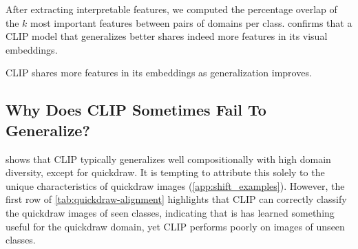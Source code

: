 After extracting interpretable features, we computed the percentage overlap of the $k$ most important features between pairs of domains per class.
 confirms that a CLIP model that generalizes better shares indeed more features in its visual embeddings.
\begin{finding}
    CLIP shares more features in its embeddings as generalization improves.
\end{finding}

\subsection{Why Does CLIP Sometimes Fail To Generalize?}\label{sec:quickdraw}
\begin{table}[t]
    \centering
    \caption{\textbf{Domain-specific captions do not explain CLIP's poor generalization performance to unseen quickdraw classes in the CG high-diversity setting.}
    As we replace all domain-specific captions (second row), we find that visual embeddings are more aligned (\cref{fig:quickdraw-alignment:aligned}) but this does not lead to improved generalization performance.
    }
    \label{tab:quickdraw-alignment}
\end{table}
 shows that CLIP typically generalizes well compositionally with high domain diversity, except for quickdraw. It is tempting to attribute this solely to the unique characteristics of quickdraw images (\cref{app:shift_examples}). However, the first row of \cref{tab:quickdraw-alignment} highlights that CLIP can correctly classify the quickdraw images of seen classes, indicating that is has learned something useful for the quickdraw domain, yet CLIP performs poorly on images of unseen classes.


